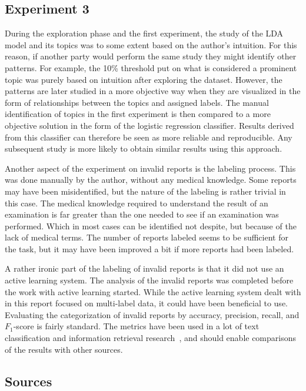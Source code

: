\subsection{Experiment 3}

During the exploration phase and the first experiment, the study of the LDA model and its topics was to some extent based on the author's intuition.
For this reason, if another party would perform the same study they might identify other patterns.
For example, the 10\% threshold put on what is considered a prominent topic was purely based on intuition after exploring the dataset.
However, the patterns are later studied in a more objective way when they are visualized in the form of relationships between the topics and assigned labels.
The manual identification of topics in the first experiment is then compared to a more objective solution in the form of the logistic regression classifier.
Results derived from this classifier can therefore be seen as more reliable and reproducible.
Any subsequent study is more likely to obtain similar results using this approach.

Another aspect of the experiment on invalid reports is the labeling process.
This was done manually by the author, without any medical knowledge.
Some reports may have been misidentified, but the nature of the labeling is rather trivial in this case.
The medical knowledge required to understand the result of an examination is far greater than the one needed to see if an examination was performed.
Which in most cases can be identified not despite, but because of the lack of medical terms.
The number of reports labeled seems to be sufficient for the task, but it may have been improved a bit if more reports had been labeled.

A rather ironic part of the labeling of invalid reports is that it did not use an active learning system.
The analysis of the invalid reports was completed before the work with active learning started.
While the active learning system dealt with in this report focused on multi-label data, it could have been beneficial to use.
Evaluating the categorization of invalid reports by accuracy, precision, recall, and $F_1$-score is fairly standard.
The metrics have been used in a lot of text classification and information retrieval research~\cite{aggarwal2012surveyclass, bishop2006pattern}, and should enable comparisons of the results with other sources.

\subsection{Sources}

